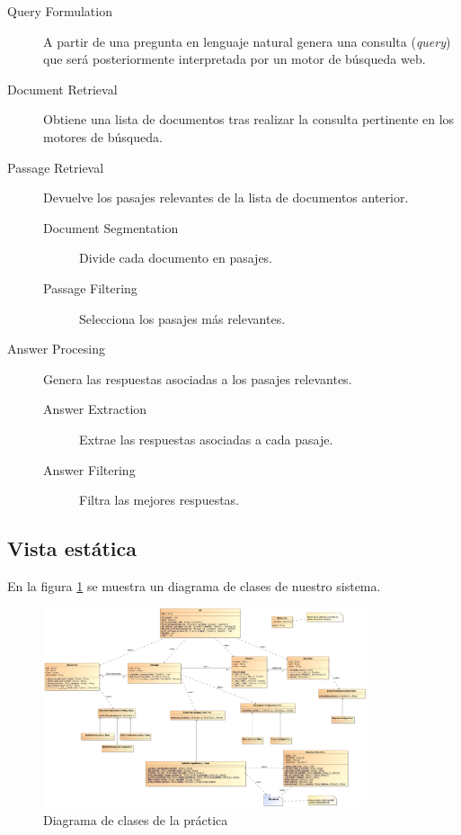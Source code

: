 \documentclass[12pt,a4paper,titlepage]{article}
\begin{document}
\begin{description}
	\item[Query Formulation] A partir de una pregunta en lenguaje natural genera una consulta (\emph{query}) que será posteriormente interpretada por un motor de búsqueda web.
	\item[Document Retrieval] Obtiene una lista de documentos tras realizar la consulta pertinente en los motores de búsqueda.
	\item[Passage Retrieval] Devuelve los pasajes relevantes de la lista de documentos anterior.
		\begin{description}
			\item[Document Segmentation] Divide cada documento en pasajes.
			\item[Passage Filtering] Selecciona los pasajes más relevantes.
		\end{description}
	\item[Answer Procesing] Genera las respuestas asociadas a los pasajes relevantes.
		\begin{description}
			\item[Answer Extraction] Extrae las respuestas asociadas a cada pasaje.
			\item[Answer Filtering]	Filtra las mejores respuestas.
		\end{description}
\end{description}

\subsection{Vista estática}
En la figura \ref{fig:clases} se muestra un diagrama de clases de nuestro sistema.


\begin{figure}[h!]
\begin{center}
\includegraphics[angle=90,width=0.85\textwidth]{res/clases}
\end{center}
\caption{Diagrama de clases de la práctica}
\label{fig:clases}
\end{figure}
\end{document}
